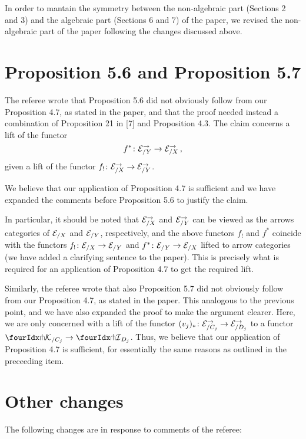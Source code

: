 \documentclass[reqno,10pt,a4paper,oneside,draft]{amsart}
\begin{document}
In order to mantain the symmetry between the non-algebraic part (Sections 2 and 3) and the algebraic part (Sections 6 and 7) 
of the paper, we revised  the non-algebraic part of the paper following the changes discussed above.  



\section*{Proposition 5.6 and Proposition 5.7}

The referee wrote that Proposition 5.6  did not obviously follow from our Proposition 4.7, as stated in the paper, and that the proof needed instead a combination of Proposition 21 in [7] and Proposition 4.3.
The claim concerns a lift of the functor
\[
f^* \co \cal{E}_{/Y}^\to \to \cal{E}_{/X}^\to
\,,\] 
given a lift of the functor $f_! \co \cal{E}_{/X}^\to \to \cal{E}_{/Y}^\to$.

We believe that our application of Proposition 4.7 is sufficient and we have expanded the comments before Proposition 5.6 to
justify the claim. 

In particular, it should be noted that $\cal{E}_{/X}^\to$ and $\cal{E}_{/Y}^\to$ can be viewed as the arrows categories of $\cal{E}_{/X}$ and $\cal{E}_{/Y}$, respectively, and the above functors $f_!$ and $f^*$ coincide with the functors $f_! \co \cal{E}_{/X} \to \cal{E}_{/Y}$ and $f^* \co \cal{E}_{/Y} \to \cal{E}_{/X}$ lifted to arrow categories (we have added a clarifying sentence to the paper).
This is precisely what is required for an application of Proposition 4.7 to get the required lift.

Similarly, the referee wrote that also Proposition 5.7  did not obviously follow from our Proposition 4.7, as stated in the paper.
This analogous to the previous point, and we have also expanded the proof to make the argument clearer. Here, we are only
concerned with a lift of the functor $(v_j)_* \co \cal{E}_{/C_j}^\to \to \cal{E}_{/D_j}^\to$ to a functor $\liftr{\cal{K}}_{/C_j} \to \liftr{\cal{I}}_{D_j}$. Thus, we believe that our application of Proposition 4.7 is sufficient, for essentially the same reasons as outlined in the preceeding item.

\section*{Other changes} 

The following changes are in response to comments of the referee: 
\end{document}

